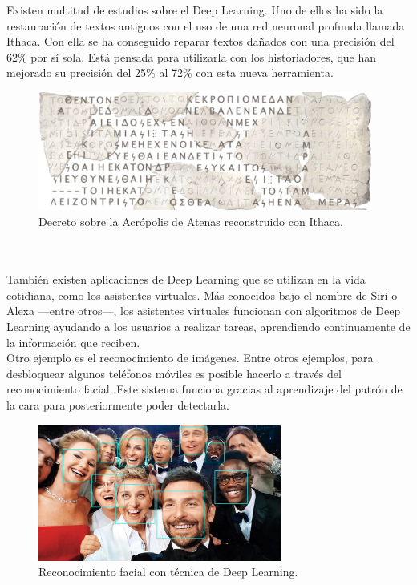 Existen multitud de estudios sobre el Deep Learning. Uno de ellos ha sido la restauración de textos antiguos con el uso de una red neuronal profunda llamada Ithaca. Con ella se ha conseguido reparar textos dañados con una precisión del 62\% por sí sola. Está pensada para utilizarla con los historiadores, que han mejorado su precisión del 25\% al 72\% con esta nueva herramienta.
\begin{figure} [h!]
  \begin{center}
    \includegraphics[width=11cm]{figs/textos}
  \end{center}
  \caption{Decreto sobre la Acrópolis de Atenas reconstruido con Ithaca.}
  \label{fig:visual}
\end{figure}\\
\\

También existen aplicaciones de Deep Learning que se utilizan en la vida cotidiana, como los asistentes virtuales. Más conocidos bajo el nombre de Siri o Alexa ---entre otros---, los asistentes virtuales funcionan con algoritmos de Deep Learning ayudando a los usuarios a realizar tareas, aprendiendo continuamente de la información que reciben.\\
Otro ejemplo es el reconocimiento de imágenes. Entre otros ejemplos, para desbloquear algunos teléfonos móviles es posible hacerlo a través del reconocimiento facial. Este sistema funciona gracias al aprendizaje del patrón de la cara para posteriormente poder detectarla.
\begin{figure} [h!]
  \begin{center}
    \includegraphics[width=8cm]{figs/caras}
  \end{center}
  \caption[]{Reconocimiento facial con técnica de Deep Learning. \footnotemark}
  \label{fig:visual}
\end{figure}\\
\\
\\
\\
\\

